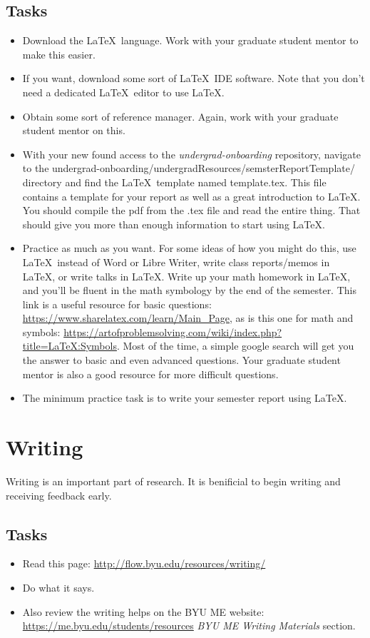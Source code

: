 \documentclass[]{article}%
\begin{document}
\subsection{Tasks}
\begin{itemize}
	\item Download the \LaTeX~language.  Work with your graduate student mentor to make this easier. 
	\item If you want, download some sort of \LaTeX~IDE software. Note that you don't need a dedicated \LaTeX~editor to use \LaTeX. 
	\item Obtain some sort of reference manager. Again, work with your graduate student mentor on this.
	\item With your new found access to the  \textit{undergrad-onboarding} repository, navigate to the undergrad-onboarding/undergradResources/semsterReportTemplate/ directory and find the \LaTeX~template named template.tex.  This file contains a template for your report as well as a great introduction to \LaTeX.  You should compile the pdf from the .tex file and read the entire thing.  That should give you more than enough information to start using \LaTeX.
	\item Practice as much as you want. For some ideas of how you might do this, use \LaTeX~instead of Word or Libre Writer, write class reports/memos in \LaTeX, or write talks in \LaTeX. Write up your math homework in \LaTeX, and you'll be fluent in the math symbology by the end of the semester. This link is a useful resource for basic questions: \url{https://www.sharelatex.com/learn/Main_Page}, as is this one for math and symbols: \url{https://artofproblemsolving.com/wiki/index.php?title=LaTeX:Symbols}.  Most of the time, a simple google search will get you the answer to basic and even advanced questions. Your graduate student mentor is also a good resource for more difficult questions.
	\item The minimum practice task is to write your semester report using \LaTeX.
\end{itemize}


\section{Writing}
Writing is an important part of research.  It is benificial to begin writing and receiving feedback early.  

\subsection{Tasks}
\begin{itemize}
	\item Read this page: \url{http://flow.byu.edu/resources/writing/}
	\item Do what it says.
	\item Also review the writing helps on the BYU ME website: \url{https://me.byu.edu/students/resources} \textit{BYU ME Writing Materials} section.
\end{itemize}
\end{document}
